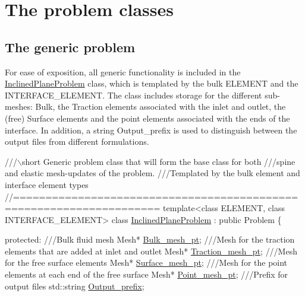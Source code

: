 \hypertarget{index_problem}{}\section{The problem classes}\label{index_problem}
\hypertarget{index_generic_prob}{}\subsection{The generic problem}\label{index_generic_prob}
For ease of exposition, all generic functionality is included in the {\ttfamily \hyperlink{classInclinedPlaneProblem}{Inclined\+Plane\+Problem}} class, which is templated by the bulk {\ttfamily E\+L\+E\+M\+E\+NT} and the {\ttfamily I\+N\+T\+E\+R\+F\+A\+C\+E\+\_\+\+E\+L\+E\+M\+E\+NT}. The class includes storage for the different sub-\/meshes\+: Bulk, the Traction elements associated with the inlet and outlet, the (free) Surface elements and the point elements associated with the ends of the interface. In addition, a string {\ttfamily Output\+\_\+prefix} is used to distinguish between the output files from different formulations.  
\begin{DoxyCodeInclude}
\textcolor{comment}{///\(\backslash\)short Generic problem class that will form the base class for both }
\textcolor{comment}{///spine and elastic mesh-updates of the problem.}
\textcolor{comment}{}\textcolor{comment}{///Templated by the bulk element and interface element types}
\textcolor{comment}{}\textcolor{comment}{//====================================================================}
\textcolor{keyword}{template}<\textcolor{keyword}{class} ELEMENT, \textcolor{keyword}{class} INTERFACE\_ELEMENT>
\textcolor{keyword}{class }\hyperlink{classInclinedPlaneProblem}{InclinedPlaneProblem} : \textcolor{keyword}{public} Problem
\{

\textcolor{keyword}{protected}:
\textcolor{comment}{}
\textcolor{comment}{ ///Bulk fluid mesh}
\textcolor{comment}{} Mesh* \hyperlink{classInclinedPlaneProblem_a20c506fe684dc146424b8ec019239783}{Bulk\_mesh\_pt};
\textcolor{comment}{}
\textcolor{comment}{ ///Mesh for the traction elements that are added at inlet and outlet}
\textcolor{comment}{} Mesh* \hyperlink{classInclinedPlaneProblem_a85bcc36a8ad4ad7aa3595585e73a3197}{Traction\_mesh\_pt};
\textcolor{comment}{}
\textcolor{comment}{ ///Mesh for the free surface elements}
\textcolor{comment}{} Mesh* \hyperlink{classInclinedPlaneProblem_aba36d367278218bf00356c3bee0733a0}{Surface\_mesh\_pt};
\textcolor{comment}{}
\textcolor{comment}{ ///Mesh for the point elements at each end of the free surface}
\textcolor{comment}{} Mesh* \hyperlink{classInclinedPlaneProblem_adefbac5880323d7de622e2ba0c526746}{Point\_mesh\_pt};
\textcolor{comment}{}
\textcolor{comment}{ ///Prefix for output files}
\textcolor{comment}{} std::string \hyperlink{classInclinedPlaneProblem_a6ad45c76bd24f63c0162313042ce2e7d}{Output\_prefix};

\end{DoxyCodeInclude}



